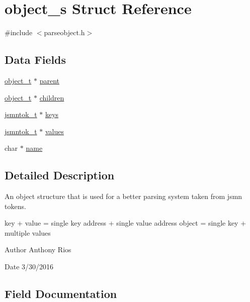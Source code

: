 \hypertarget{structobject__s}{}\section{object\+\_\+s Struct Reference}
\label{structobject__s}


{\ttfamily \#include $<$parseobject.\+h$>$}

\subsection*{Data Fields}
\begin{DoxyCompactItemize}
\item 
\hyperlink{parseobject_8h_a965db53884ff9e4e077dd5e2e2d6a5e2}{object\+\_\+t} $\ast$ \hyperlink{structobject__s_a444f5b5cbba653b103c8841fa8536b8d}{parent}
\item 
\hyperlink{parseobject_8h_a965db53884ff9e4e077dd5e2e2d6a5e2}{object\+\_\+t} $\ast$ \hyperlink{structobject__s_a2746ae4a23a7e9cd4c7d266d32c3f30f}{children}
\item 
\hyperlink{structjsmntok__t}{jsmntok\+\_\+t} $\ast$ \hyperlink{structobject__s_a720905251b014f5c9ec82e66e8463f4e}{keys}
\item 
\hyperlink{structjsmntok__t}{jsmntok\+\_\+t} $\ast$ \hyperlink{structobject__s_ab74cb2267ebadadd15e6bb59e85cc3f9}{values}
\item 
char $\ast$ \hyperlink{structobject__s_a5ac083a645d964373f022d03df4849c8}{name}
\end{DoxyCompactItemize}


\subsection{Detailed Description}
An object structure that is used for a better parsing system taken from jsmn tokens.

key + value = single key address + single value address object = single key + multiple values

\begin{DoxyAuthor}{Author}
Anthony Rios 
\end{DoxyAuthor}
\begin{DoxyDate}{Date}
3/30/2016 
\end{DoxyDate}


\subsection{Field Documentation}
